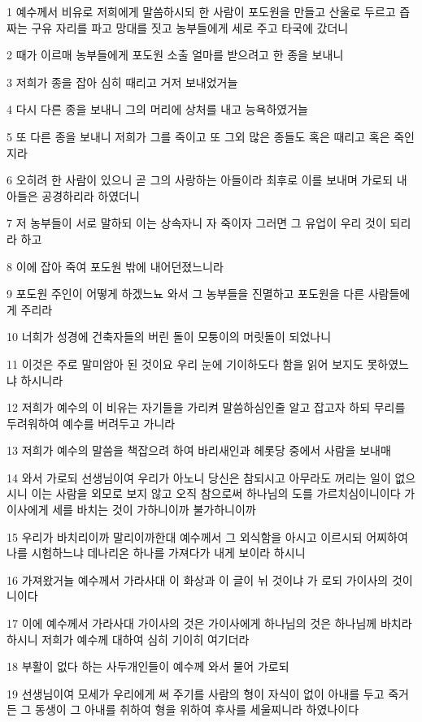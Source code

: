 \par 1 예수께서 비유로 저희에게 말씀하시되 한 사람이 포도원을 만들고 산울로 두르고 즙 짜는 구유 자리를 파고 망대를 짓고 농부들에게 세로 주고 타국에 갔더니
\par 2 때가 이르매 농부들에게 포도원 소출 얼마를 받으려고 한 종을 보내니
\par 3 저희가 종을 잡아 심히 때리고 거저 보내었거늘
\par 4 다시 다른 종을 보내니 그의 머리에 상처를 내고 능욕하였거늘
\par 5 또 다른 종을 보내니 저희가 그를 죽이고 또 그외 많은 종들도 혹은 때리고 혹은 죽인지라
\par 6 오히려 한 사람이 있으니 곧 그의 사랑하는 아들이라 최후로 이를 보내며 가로되 내 아들은 공경하리라 하였더니
\par 7 저 농부들이 서로 말하되 이는 상속자니 자 죽이자 그러면 그 유업이 우리 것이 되리라 하고
\par 8 이에 잡아 죽여 포도원 밖에 내어던졌느니라
\par 9 포도원 주인이 어떻게 하겠느뇨 와서 그 농부들을 진멸하고 포도원을 다른 사람들에게 주리라
\par 10 너희가 성경에 건축자들의 버린 돌이 모퉁이의 머릿돌이 되었나니
\par 11 이것은 주로 말미암아 된 것이요 우리 눈에 기이하도다 함을 읽어 보지도 못하였느냐 하시니라
\par 12 저희가 예수의 이 비유는 자기들을 가리켜 말씀하심인줄 알고 잡고자 하되 무리를 두려워하여 예수를 버려두고 가니라
\par 13 저희가 예수의 말씀을 책잡으려 하여 바리새인과 헤롯당 중에서 사람을 보내매
\par 14 와서 가로되 선생님이여 우리가 아노니 당신은 참되시고 아무라도 꺼리는 일이 없으시니 이는 사람을 외모로 보지 않고 오직 참으로써 하나님의 도를 가르치심이니이다 가이사에게 세를 바치는 것이 가하니이까 불가하니이까
\par 15 우리가 바치리이까 말리이까한대 예수께서 그 외식함을 아시고 이르시되 어찌하여 나를 시험하느냐 데나리온 하나를 가져다가 내게 보이라 하시니
\par 16 가져왔거늘 예수께서 가라사대 이 화상과 이 글이 뉘 것이냐 가 로되 가이사의 것이니이다
\par 17 이에 예수께서 가라사대 가이사의 것은 가이사에게 하나님의 것은 하나님께 바치라 하시니 저희가 예수께 대하여 심히 기이히 여기더라
\par 18 부활이 없다 하는 사두개인들이 예수께 와서 물어 가로되
\par 19 선생님이여 모세가 우리에게 써 주기를 사람의 형이 자식이 없이 아내를 두고 죽거든 그 동생이 그 아내를 취하여 형을 위하여 후사를 세울찌니라 하였나이다
